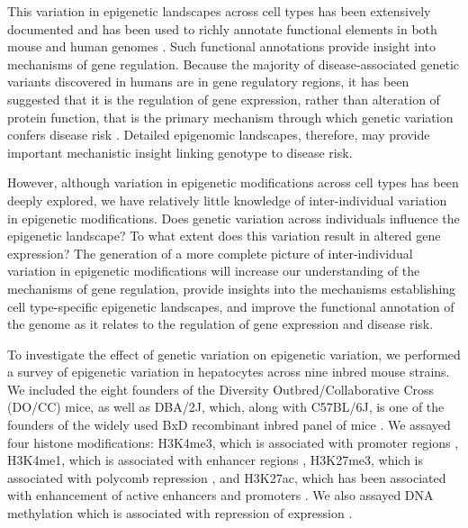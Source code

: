 \documentclass[
  11pt,
]{article}
\begin{document}
This variation in epigenetic landscapes across cell types has been
extensively documented \citep{pmid21441907, pmid25693563} and has been
used to richly annotate functional elements in both mouse
\citep{stamatoyannopoulos2012encyclopedia, baker2019tissue, yue2014comparative}
and human genomes \citep{pmid25693563, pmid23595227, pmid20657582}. Such
functional annotations provide insight into mechanisms of gene
regulation. Because the majority of disease-associated genetic variants
discovered in humans are in gene regulatory regions, it has been
suggested that it is the regulation of gene expression, rather than
alteration of protein function, that is the primary mechanism through
which genetic variation confers disease risk
\citep{maurano2012systematic, farh2015genetic, pmid21617055, pmid19474294}.
Detailed epigenomic landscapes, therefore, may provide important
mechanistic insight linking genotype to disease risk.

However, although variation in epigenetic modifications across cell
types has been deeply explored, we have relatively little knowledge of
inter-individual variation in epigenetic modifications. Does genetic
variation across individuals influence the epigenetic landscape? To what
extent does this variation result in altered gene expression? The
generation of a more complete picture of inter-individual variation in
epigenetic modifications will increase our understanding of the
mechanisms of gene regulation, provide insights into the mechanisms
establishing cell type-specific epigenetic landscapes, and improve the
functional annotation of the genome as it relates to the regulation of
gene expression and disease risk.

To investigate the effect of genetic variation on epigenetic variation,
we performed a survey of epigenetic variation in hepatocytes across nine
inbred mouse strains. We included the eight founders of the Diversity
Outbred/Collaborative Cross (DO/CC) \citep{Svenson:2012hq} mice, as well
as DBA/2J, which, along with C57BL/6J, is one of the founders of the
widely used BxD recombinant inbred panel of mice
\citep{Ashbrook:2019bd}. We assayed four histone modifications: H3K4me3,
which is associated with promoter regions
\citep{heintzman2007distinct, pmid15680324}, H3K4me1, which is
associated with enhancer regions \citep{heintzman2007distinct},
H3K27me3, which is associated with polycomb repression
\citep{bonasio2010molecular}, and H3K27ac, which has been associated
with enhancement of active enhancers and promoters
\citep{creyghton2010histone, heintzman2009histone, rada2011unique}. We
also assayed DNA methylation which is associated with repression of
expression \citep{moore2013dna, jones2012functions}.
\end{document}
